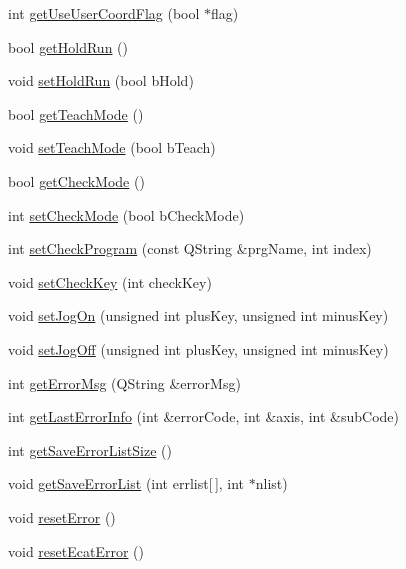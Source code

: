\begin{DoxyCompactItemize}
\item 
int \hyperlink{classCUIApp_afae22d445cdef37f9c797084f16fc055}{get\-Use\-User\-Coord\-Flag} (bool $\ast$flag)
\item 
bool \hyperlink{classCUIApp_a51873975bdae2a082cf93ecd28592517}{get\-Hold\-Run} ()
\item 
void \hyperlink{classCUIApp_af3be79ba4b9c4feda7db65ea1c664d07}{set\-Hold\-Run} (bool b\-Hold)
\item 
bool \hyperlink{classCUIApp_a1e13081fe2b308c0ed6b48515d8e3ee1}{get\-Teach\-Mode} ()
\item 
void \hyperlink{classCUIApp_ac2f4c21479ef20f75ac6f5076835b15f}{set\-Teach\-Mode} (bool b\-Teach)
\item 
bool \hyperlink{classCUIApp_adaf17858538066ca486e6dba3cfe40bf}{get\-Check\-Mode} ()
\item 
int \hyperlink{classCUIApp_ab417f07d00c8d7804ee29dc16c9d1cef}{set\-Check\-Mode} (bool b\-Check\-Mode)
\item 
int \hyperlink{classCUIApp_a4806d708e39f2aa3392cdcfefe31fd28}{set\-Check\-Program} (const Q\-String \&prg\-Name, int index)
\item 
void \hyperlink{classCUIApp_af1cb9ef08858fc07b9fdb1a541c4f1a7}{set\-Check\-Key} (int check\-Key)
\item 
void \hyperlink{classCUIApp_a8810e1c9c6852373f02dd63c46b40aa9}{set\-Jog\-On} (unsigned int plus\-Key, unsigned int minus\-Key)
\item 
void \hyperlink{classCUIApp_a307e341b403a08fa1bb43738eff18698}{set\-Jog\-Off} (unsigned int plus\-Key, unsigned int minus\-Key)
\item 
int \hyperlink{classCUIApp_ab89ed3cfa8984f02170f51f064ef800b}{get\-Error\-Msg} (Q\-String \&error\-Msg)
\item 
int \hyperlink{classCUIApp_aa9b6b12846d38b038afdebb423e66d30}{get\-Last\-Error\-Info} (int \&error\-Code, int \&axis, int \&sub\-Code)
\item 
int \hyperlink{classCUIApp_a843c50491f63fba830c9d321b4af811b}{get\-Save\-Error\-List\-Size} ()
\item 
void \hyperlink{classCUIApp_abf330221079f242d37032e212d0cf401}{get\-Save\-Error\-List} (int errlist\mbox{[}$\,$\mbox{]}, int $\ast$nlist)
\item 
void \hyperlink{classCUIApp_a7e636d2d36cc25795e286cdc9b20b292}{reset\-Error} ()
\item 
void \hyperlink{classCUIApp_a49cb79bd21645b2247a7246c23178940}{reset\-Ecat\-Error} ()
\item 

\end{DoxyCompactItemize}

